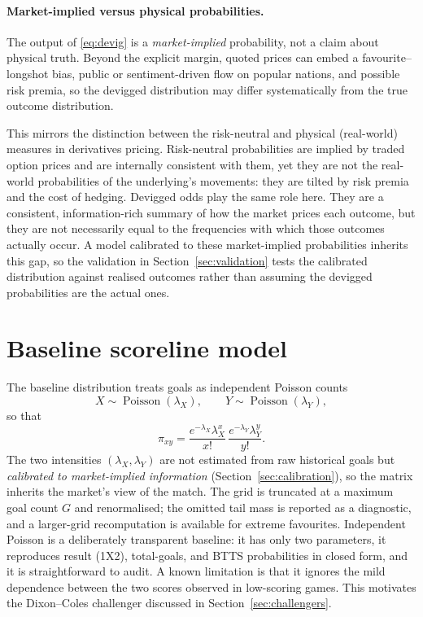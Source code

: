 \documentclass[11pt]{article}
\begin{document}
\paragraph{Market-implied versus physical probabilities.} The output of \eqref{eq:devig} is a \emph{market-implied} probability, not a claim about physical truth.
Beyond the explicit margin, quoted prices can embed a favourite--longshot bias, public or 
sentiment-driven flow on popular nations, and possible risk premia, so the devigged distribution
may differ systematically from the true outcome distribution. 

This mirrors the distinction between the risk-neutral and physical (real-world) measures in derivatives pricing. Risk-neutral probabilities are implied by traded option prices and are internally consistent with them, yet they are not the real-world probabilities of the underlying's movements: they are tilted by risk premia and the cost of hedging. Devigged odds play the same role here. They are a consistent, information-rich summary of how the market prices each outcome, but they are not necessarily equal to the frequencies with which those outcomes actually occur. A model calibrated to these market-implied probabilities inherits this gap, so the validation in Section~\ref{sec:validation} tests the calibrated distribution against realised outcomes rather than assuming the devigged probabilities are the actual ones.

\section{Baseline scoreline model}

The baseline distribution treats goals as independent Poisson counts \cite{maher1982}
\[
X\sim\operatorname{Poisson}(\lambda_X),\qquad
Y\sim\operatorname{Poisson}(\lambda_Y),
\]
so that
\begin{equation}
\pi_{xy}
=\frac{e^{-\lambda_X}\lambda_X^{x}}{x!}\,
 \frac{e^{-\lambda_Y}\lambda_Y^{y}}{y!}.
\label{eq:poisson}
\end{equation}
The two intensities $(\lambda_X,\lambda_Y)$ are not estimated from raw historical goals but
\emph{calibrated to market-implied information} (Section~\ref{sec:calibration}), so the
matrix inherits the market's view of the match. The grid is truncated at a maximum goal
count $G$ and renormalised; the omitted tail mass is reported as a diagnostic, and a
larger-grid recomputation is available for extreme favourites. Independent Poisson is a
deliberately transparent baseline: it has only two parameters, it reproduces result (1X2), total-goals, and BTTS probabilities in closed form, and it is straightforward to audit. A known limitation is that it ignores the mild dependence between the two scores observed in low-scoring games. This motivates the Dixon--Coles challenger discussed in Section~\ref{sec:challengers}.
\end{document}
